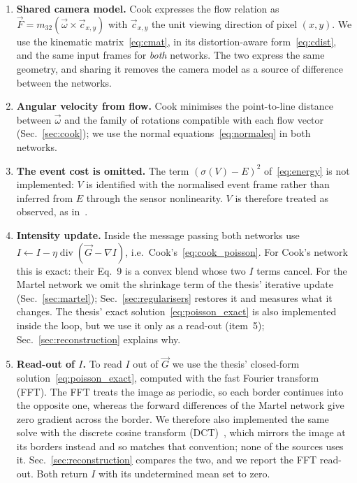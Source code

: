 \documentclass[journal]{IEEEtran}
\newcommand{\Imap}{I}
\newcommand{\Vmap}{V}
\newcommand{\Gmap}{\vec{G}}
\newcommand{\Fmap}{\vec{F}}
\newcommand{\wvec}{\vec{\omega}}
\begin{document}
\begin{enumerate}
\item \textbf{Shared camera model.} Cook expresses the flow relation as $\Fmap = m_{32}(\wvec\times\vec c_{x,y})$ with $\vec c_{x,y}$ the unit  viewing direction of pixel $(x,y)$. We use the kinematic  matrix~\eqref{eq:cmat}, in its distortion-aware form~\eqref{eq:cdist}, and  the same input frames for \emph{both} networks. The two express the same  geometry, and sharing it removes the camera model as a source of difference  between the networks.

\item \textbf{Angular velocity from flow.} Cook minimises the point-to-line distance between $\wvec$ and the family of rotations compatible with each flow vector (Sec.~\ref{sec:cook}); we use the normal equations~\eqref{eq:normaleq} in both networks.

\item \textbf{The event cost is omitted.} The term $(\sigma(\Vmap)-E)^2$ of~\eqref{eq:energy} is not implemented: $\Vmap$ is identified with the normalised event frame rather than inferred from $E$ through the sensor nonlinearity. $\Vmap$ is therefore treated as observed, as in~\cite{cook2011}.

\item \textbf{Intensity update.} Inside the message passing both networks use $\Imap \leftarrow \Imap - \eta\operatorname{div}(\Gmap-\nabla \Imap)$, i.e.\ Cook's~\eqref{eq:cook_poisson}. For Cook's network this is exact: their Eq.~9 is a convex blend whose two $\Imap$ terms cancel. For the Martel network we omit the shrinkage term of the thesis' iterative update (Sec.~\ref{sec:martel});
  Sec.~\ref{sec:regularisers} restores it and measures what it changes. The thesis' exact solution~\eqref{eq:poisson_exact} is also implemented inside the loop, but we use it only as a read-out (item~5); Sec.~\ref{sec:reconstruction} explains why.

\item \textbf{Read-out of $\Imap$.} To read $\Imap$ out of $\Gmap$ we use the thesis' closed-form solution~\eqref{eq:poisson_exact}, computed with the fast Fourier transform (FFT). The FFT treats the image as periodic, so each border continues into the opposite one, whereas the forward differences of the Martel network give zero gradient across the border. We therefore also implemented the same solve with the discrete cosine transform (DCT)~\cite{simchony1990}, which mirrors the image at its borders instead and so matches that convention; none of the sources uses it. Sec.~\ref{sec:reconstruction} compares the two, and we report the FFT read-out. Both return $\Imap$ with its undetermined mean set to zero.
  

\end{enumerate}
\end{document}
